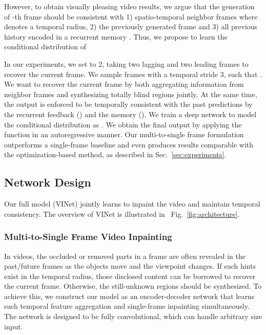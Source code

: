 \documentclass[10pt,twocolumn,letterpaper]{article}
\newcommand{\figref}[1]{Fig.~\ref{#1}}
\newcommand{\secref}[1]{Sec.~\ref{#1}}
\begin{document}
However, to obtain visually pleasing video results, we argue that the generation of -th frame  should be consistent with 1) spatio-temporal neighbor frames  where  denotes a temporal radius, 2) the previously generated frame  and 3) all previous history encoded in a recurrent memory . Thus, we propose to learn the conditional distribution of


In our experiments, we set  to 2, taking two lagging and two leading frames to recover the current frame. We sample frames with a temporal stride 3, such that . We want to recover the current frame by both aggregating information from neighbor frames and synthesizing totally blind regions jointly.
At the same time, the output is enforced to be temporally consistent with the past predictions by the recurrent feedback () and the memory (). We train a deep network  to model the conditional distribution  as . We obtain the final output  by applying the function  in an autoregressive manner. Our multi-to-single frame formulation outperforms a single-frame baseline and even produces results comparable with the optimization-based method, as described in \secref{sec:experiments}.


\subsection{Network Design}

Our full model (VINet) jointly learns to inpaint the video and maintain temporal consistency. The overview of VINet is illustrated in ~\figref{fig:architecture}.


\subsubsection{Multi-to-Single Frame Video Inpainting}
In videos, the occluded or removed parts in a frame are often revealed in the past/future frames as the objects move and the viewpoint changes. If such hints exist in the temporal radius, those disclosed content can be borrowed to recover the current frame. Otherwise, the still-unknown regions should be synthesized. To achieve this, we construct our model as an encoder-decoder network that learns such temporal feature aggregation and single-frame inpainting simultaneously. The network is designed to be fully convolutional, which can handle arbitrary size input. 
\end{document}
